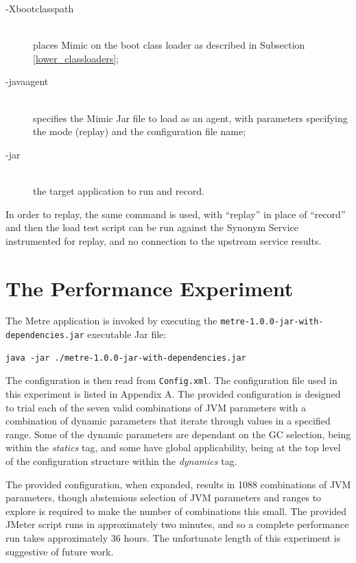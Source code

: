 \documentclass[]{final_report}
\begin{document}
\begin{description}
\item[-Xbootclasspath] \hfill \\ places Mimic on the boot class loader as described in Subsection \ref{lower_classloaders};
\item[-javaagent] \hfill \\ specifies the Mimic Jar file to load as an agent, with parameters specifying the mode (replay) and the configuration file name;
\item[-jar] \hfill \\ the target application to run and record.
\end{description}

In order to replay, the same command is used, with ``replay'' in place of ``record'' and then the load test script can be run against the Synonym Service instrumented for replay, and no connection to the upstream service results.

\section*{The Performance Experiment \label{performance_experiment}}

The Metre application is invoked by executing the \lstinline{metre-1.0.0-jar-with-dependencies.jar}\noop{} executable Jar file:

\begin{lstlisting}
java -jar ./metre-1.0.0-jar-with-dependencies.jar
\end{lstlisting}

The configuration is then read from \lstinline{Config.xml}. The configuration file used in this experiment is listed in Appendix A. The provided configuration is designed to trial each of the seven valid combinations of JVM parameters with a combination of dynamic parameters that iterate through values in a specified range. Some of the dynamic parameters are dependant on the GC selection, being within the \textit{statics} tag, and some have global applicability, being at the top level of the configuration structure within the \textit{dynamics} tag.

The provided configuration, when expanded, results in 1088 combinations of JVM parameters, though abstemious selection of JVM parameters and ranges to explore is required to make the number of combinations this small. The provided JMeter script runs in approximately two minutes, and so a complete performance run takes approximately 36 hours. The unfortunate length of this experiment is suggestive of future work.
\end{document}
